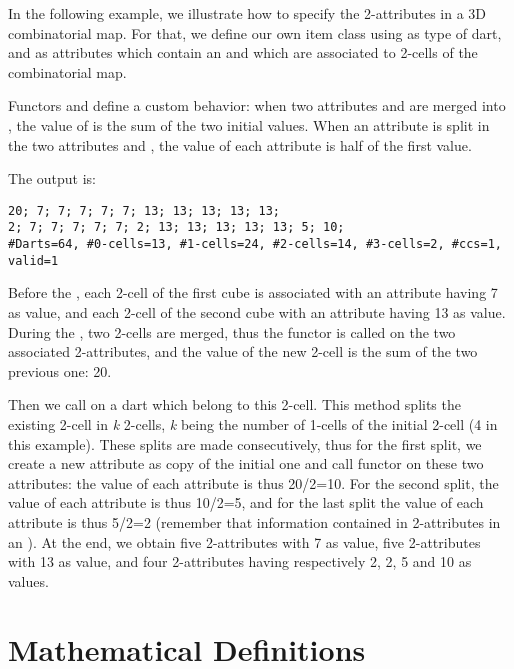 In the following example, we illustrate how to specify the
2-attributes in a 3D combinatorial map. For that, we define our own
item class using  as type of dart, and
as attributes which contain an  and which are associated to
2-cells of the combinatorial map.

Functors  and  define a
custom behavior: when two attributes  and  are
merged into , the value of  is the sum of the
two initial values.  When an attribute  is split in the two
attributes  and , the value of each attribute is
half of the first value.


The output is:
\begin{verbatim}
20; 7; 7; 7; 7; 7; 13; 13; 13; 13; 13; 
2; 7; 7; 7; 7; 7; 2; 13; 13; 13; 13; 13; 5; 10; 
#Darts=64, #0-cells=13, #1-cells=24, #2-cells=14, #3-cells=2, #ccs=1, valid=1
\end{verbatim}

Before the , each 2-cell of the first cube is
associated with an attribute having 7 as value, and each 2-cell of the
second cube with an attribute having 13 as value. During the
, two 2-cells are merged, thus the functor
 is called on the two associated 2-attributes, and
the value of the new 2-cell is the sum of the two previous one: 20.

Then we call  on a dart which
belong to this 2-cell. This method splits the existing 2-cell in \emph{k}
2-cells, \emph{k} being the number of 1-cells of the initial 2-cell (4 in
this example). These splits are made consecutively, thus for the first
split, we create a new attribute as copy of the initial one and call
functor  on these two attributes: the value
of each attribute is thus 20/2=10. For the second split, the value of
each attribute is thus 10/2=5, and for the last split the value of
each attribute is thus 5/2=2 (remember that information contained in
2-attributes in an ).  At the end, we obtain five
2-attributes with 7 as value, five 2-attributes with 13 as value, and
four 2-attributes having respectively 2, 2, 5 and 10 as values.

\section{Mathematical Definitions}\label{sec_definition}

